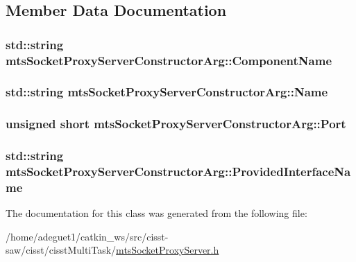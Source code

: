 \subsection{Member Data Documentation}
\hypertarget{classmts_socket_proxy_server_constructor_arg_a7cd929776ffbbf302ec5fcc98868cab3}{
\subsubsection[{Component\-Name}]{\setlength{\rightskip}{0pt plus 5cm}std\-::string mts\-Socket\-Proxy\-Server\-Constructor\-Arg\-::\-Component\-Name}}\label{classmts_socket_proxy_server_constructor_arg_a7cd929776ffbbf302ec5fcc98868cab3}
\hypertarget{classmts_socket_proxy_server_constructor_arg_a05eb610590735162e1be4eafc818dce4}{
\subsubsection[{Name}]{\setlength{\rightskip}{0pt plus 5cm}std\-::string mts\-Socket\-Proxy\-Server\-Constructor\-Arg\-::\-Name}}\label{classmts_socket_proxy_server_constructor_arg_a05eb610590735162e1be4eafc818dce4}
\hypertarget{classmts_socket_proxy_server_constructor_arg_ac07f9d939ccab28f9e3a81376b24d1c1}{
\subsubsection[{Port}]{\setlength{\rightskip}{0pt plus 5cm}unsigned short mts\-Socket\-Proxy\-Server\-Constructor\-Arg\-::\-Port}}\label{classmts_socket_proxy_server_constructor_arg_ac07f9d939ccab28f9e3a81376b24d1c1}
\hypertarget{classmts_socket_proxy_server_constructor_arg_a4139b875611ccc0e0e3ab736de92262a}{
\subsubsection[{Provided\-Interface\-Name}]{\setlength{\rightskip}{0pt plus 5cm}std\-::string mts\-Socket\-Proxy\-Server\-Constructor\-Arg\-::\-Provided\-Interface\-Name}}\label{classmts_socket_proxy_server_constructor_arg_a4139b875611ccc0e0e3ab736de92262a}


The documentation for this class was generated from the following file\-:\begin{DoxyCompactItemize}
\item 
/home/adeguet1/catkin\-\_\-ws/src/cisst-\/saw/cisst/cisst\-Multi\-Task/\hyperlink{mts_socket_proxy_server_8h}{mts\-Socket\-Proxy\-Server.\-h}\end{DoxyCompactItemize}
